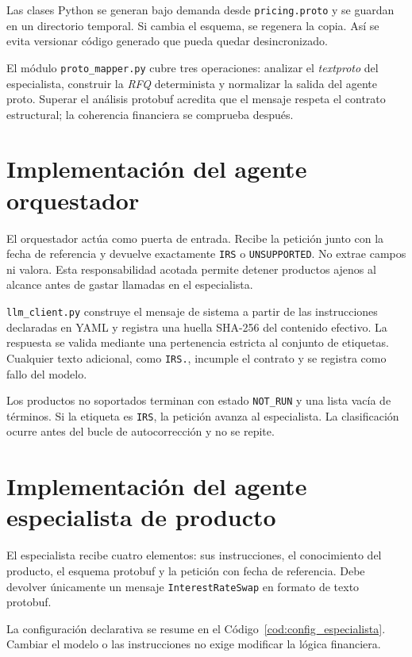 Las clases Python se generan bajo demanda desde \texttt{pricing.proto} y se guardan en un directorio temporal. Si cambia el esquema, se regenera la copia. Así se evita versionar código generado que pueda quedar desincronizado.

El módulo \texttt{proto\_mapper.py} cubre tres operaciones: analizar el \textit{textproto} del especialista, construir la \textit{RFQ} determinista y normalizar la salida del agente proto. Superar el análisis protobuf acredita que el mensaje respeta el contrato estructural; la coherencia financiera se comprueba después.

\section{Implementación del agente orquestador}
\label{sec:implementacion_orquestador}

El orquestador actúa como puerta de entrada. Recibe la petición junto con la fecha de referencia y devuelve exactamente \texttt{IRS} o \texttt{UNSUPPORTED}. No extrae campos ni valora. Esta responsabilidad acotada permite detener productos ajenos al alcance antes de gastar llamadas en el especialista.

\texttt{llm\_client.py} construye el mensaje de sistema a partir de las instrucciones declaradas en YAML y registra una huella SHA-256 del contenido efectivo. La respuesta se valida mediante una pertenencia estricta al conjunto de etiquetas. Cualquier texto adicional, como \texttt{IRS.}, incumple el contrato y se registra como fallo del modelo.

Los productos no soportados terminan con estado \texttt{NOT\_RUN} y una lista vacía de términos. Si la etiqueta es \texttt{IRS}, la petición avanza al especialista. La clasificación ocurre antes del bucle de autocorrección y no se repite.

\section{Implementación del agente especialista de producto}
\label{sec:implementacion_especialista}

El especialista recibe cuatro elementos: sus instrucciones, el conocimiento del producto, el esquema protobuf y la petición con fecha de referencia. Debe devolver únicamente un mensaje \texttt{InterestRateSwap} en formato de texto protobuf.

La configuración declarativa se resume en el Código~\ref{cod:config_especialista}. Cambiar el modelo o las instrucciones no exige modificar la lógica financiera.

